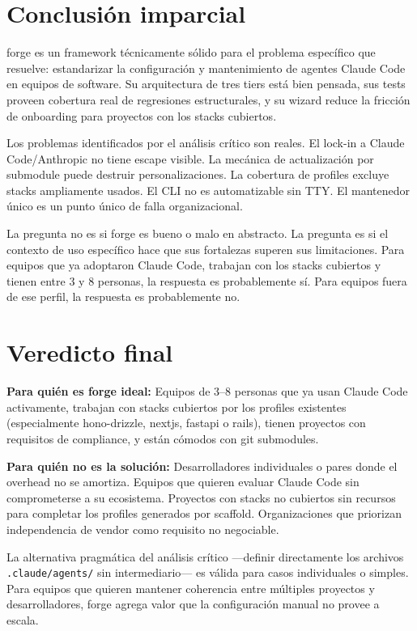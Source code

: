 \documentclass[12pt,a4paper]{article}
\begin{document}
\section{Conclusión imparcial}

forge es un framework t\'ecnicamente s\'olido para el problema espec\'ifico que resuelve: estandarizar la configuraci\'on y mantenimiento de agentes Claude Code en equipos de software. Su arquitectura de tres tiers est\'a bien pensada, sus tests proveen cobertura real de regresiones estructurales, y su wizard reduce la fricci\'on de onboarding para proyectos con los stacks cubiertos.

Los problemas identificados por el an\'alisis cr\'itico son reales. El lock-in a Claude Code/Anthropic no tiene escape visible. La mec\'anica de actualizaci\'on por submodule puede destruir personalizaciones. La cobertura de profiles excluye stacks ampliamente usados. El CLI no es automatizable sin TTY. El mantenedor \'unico es un punto \'unico de falla organizacional.

La pregunta no es si forge es bueno o malo en abstracto. La pregunta es si el contexto de uso espec\'ifico hace que sus fortalezas superen sus limitaciones. Para equipos que ya adoptaron Claude Code, trabajan con los stacks cubiertos y tienen entre 3 y 8 personas, la respuesta es probablemente s\'i. Para equipos fuera de ese perfil, la respuesta es probablemente no.

\section{Veredicto final}

\textbf{Para qui\'en es forge ideal:} Equipos de 3--8 personas que ya usan Claude Code activamente, trabajan con stacks cubiertos por los profiles existentes (especialmente hono-drizzle, nextjs, fastapi o rails), tienen proyectos con requisitos de compliance, y est\'an c\'omodos con git submodules.

\textbf{Para qui\'en no es la soluci\'on:} Desarrolladores individuales o pares donde el overhead no se amortiza. Equipos que quieren evaluar Claude Code sin comprometerse a su ecosistema. Proyectos con stacks no cubiertos sin recursos para completar los profiles generados por scaffold. Organizaciones que priorizan independencia de vendor como requisito no negociable.

La alternativa pragm\'atica del an\'alisis cr\'itico ---definir directamente los archivos \texttt{.claude/agents/} sin intermediario--- es v\'alida para casos individuales o simples. Para equipos que quieren mantener coherencia entre m\'ultiples proyectos y desarrolladores, forge agrega valor que la configuraci\'on manual no provee a escala.
\end{document}
